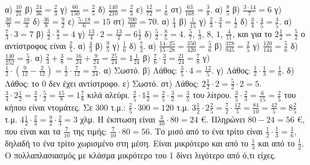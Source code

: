  α) $\frac{10}{21}$ \quad β) $\frac{24}{36}=\frac{2}{3}$ \quad γ) $\frac{60}{150}=\frac{2}{5}$ \quad δ) $\frac{140}{210}=\frac{2}{3}$ \quad ε) $\frac{12}{72}=\frac{1}{6}$ \quad στ) $\frac{63}{168}=\frac{3}{8}$.
 α) $\frac{8}{5}$ \quad β) $\frac{3\cdot 14}{7}=6$ \quad γ) $\frac{30}{9}=\frac{10}{3}$ \quad δ) $\frac{36}{8}=\frac{9}{2}$ \quad ε) $\frac{5\cdot 18}{6}=15$ \quad στ) $\frac{700}{10}=70$.
 α) $\frac{1}{4}$ \quad β) $\frac{1}{15}$ \quad γ) $\frac{2}{3}\cdot\frac{3}{4}=\frac{1}{2}$ \quad δ) $\frac{3}{4}\cdot\frac{4}{5}=\frac{3}{5}$.
 α) $\frac{7}{3}\cdot 3=7$ \quad β) $\frac{3}{2}\cdot\frac{8}{3}=4$ \quad γ) $\frac{13}{4}\cdot 2=\frac{13}{2}=6\frac{1}{2}$ \quad δ) $\frac{5}{2}\cdot\frac{8}{5}=4$.
 $\frac{5}{7}$, $\frac{1}{3}$, $8$, $1$, $\frac{4}{11}$, και για το $2\frac{1}{2}=\frac{5}{2}$ ο αντίστροφος είναι $\frac{2}{5}$.
 α) $\frac{4}{3}$ \quad β) $\frac{9}{5}$ \quad γ) $\frac{1}{6}$ \quad δ) $\frac{7}{2}$.
 α) $\frac{14\cdot 25}{15\cdot 28}=\frac{350}{420}=\frac{5}{6}$ \quad β) $\frac{378}{945}=\frac{2}{5}$ \quad γ) $\frac{120}{144}=\frac{5}{6}$ \quad δ) $\frac{140}{252}=\frac{5}{9}$.
 α) $\frac{2}{3}+\frac{3}{8}=\frac{16}{24}+\frac{9}{24}=\frac{25}{24}=1\frac{1}{24}$ \quad β) $\frac{7}{6}\cdot\frac{3}{4}=\frac{21}{24}=\frac{7}{8}$ \quad γ) $\frac{1}{2}\cdot\left(\frac{9}{12}-\frac{2}{12}\right)=\frac{1}{2}\cdot\frac{7}{12}=\frac{7}{24}$.
 α) Σωστό. β) Λάθος: $\frac{3}{5}\cdot 4=\frac{12}{5}$. γ) Λάθος: $\frac{1}{2}\cdot\frac{1}{3}=\frac{1}{6}$. δ) Λάθος: το 0 δεν έχει αντίστροφο. ε) Σωστό. στ) Λάθος: $2\frac{1}{2}\cdot 2=\frac{5}{2}\cdot 2=5$.
 $\frac{3}{4}\cdot 2\frac{1}{2}=\frac{3}{4}\cdot\frac{5}{2}=\frac{15}{8}=1\frac{7}{8}$ κιλά αλεύρι.
 $\frac{2}{5}\cdot 1\frac{1}{2}=\frac{2}{5}\cdot\frac{3}{2}=\frac{3}{5}$ του λίτρου.
 $\frac{3}{5}\cdot\frac{2}{3}=\frac{6}{15}=\frac{2}{5}$ του κήπου είναι ντομάτες. Σε $300$ τ.μ.: $\frac{2}{5}\cdot 300=120$ τ.μ.
 $3\frac{1}{2}\cdot 2\frac{2}{5}=\frac{7}{2}\cdot\frac{12}{5}=\frac{84}{10}=\frac{42}{5}=8\frac{2}{5}$ τ.μ.
 $4\frac{1}{2}\cdot\frac{2}{3}=\frac{9}{2}\cdot\frac{2}{3}=3$ χλμ.
 Η έκπτωση είναι $\frac{3}{10}\cdot 80=24$ €. Πληρώνει $80-24=56$ €, που είναι και τα $\frac{7}{10}$ της τιμής: $\frac{7}{10}\cdot 80=56$.
 Το μισό από το ένα τρίτο είναι $\frac{1}{2}\cdot\frac{1}{3}=\frac{1}{6}$, δηλαδή το ένα τρίτο χωρισμένο στη μέση. Είναι μικρότερο και από το $\frac{1}{3}$ και από το $\frac{1}{2}$. Ο πολλαπλασιασμός με κλάσμα μικρότερο του 1 δίνει λιγότερο από ό,τι είχες.
